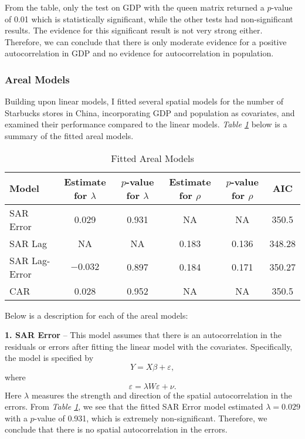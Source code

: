 \documentclass{article}
\begin{document}
From the table, only the test on GDP with the queen matrix returned a \(p\)-value of 0.01 which is statistically significant, while the other tests had non-significant results. The evidence for this significant result is not very strong either. Therefore, we can conclude that there is only moderate evidence for a positive autocorrelation in GDP and no evidence for autocorrelation in population.

\subsubsection{Areal Models}

Building upon linear models, I fitted several spatial models for the number of Starbucks stores in China, incorporating GDP and population as covariates, and examined their performance compared to the linear models. \textit{Table \ref{tab:areal_models}} below is a summary of the fitted areal models.

\begin{table}[htbp]
    \centering
    \begin{tabular}{l c c c c c}
        \toprule
        \textbf{Model} & \textbf{Estimate for \(\lambda\)} & \textbf{\(p\)-value for \(\lambda\)} & \textbf{Estimate for \(\rho\)} & \textbf{\(p\)-value for \(\rho\)} & \textbf{AIC}\\
        \midrule
        SAR Error & 0.029 & 0.931 & NA & NA & 350.5 \\
        SAR Lag & NA & NA & 0.183 & 0.136 & 348.28 \\
        SAR Lag-Error & \(-0.032\) & 0.897 & 0.184 & 0.171 & 350.27 \\
        CAR & 0.028 & 0.952 & NA & NA & 350.5 \\
        \bottomrule
    \end{tabular}
    \caption{Fitted Areal Models}
    \label{tab:areal_models}
\end{table}

Below is a description for each of the areal models:

\textbf{1. SAR Error} -- This model assumes that there is an autocorrelation in the residuals or errors after fitting the linear model with the covariates. Specifically, the model is specified by
\[Y=X\beta + \varepsilon,\]
where
\[\varepsilon = \lambda W \varepsilon + \nu.\]
Here \(\lambda\) measures the strength and direction of the spatial autocorrelation in the errors. From \textit{Table \ref{tab:areal_models}}, we see that the fitted SAR Error model estimated \(\lambda = 0.029\) with a \(p\)-value of 0.931, which is extremely non-significant. Therefore, we conclude that there is no spatial autocorrelation in the errors.
\end{document}
